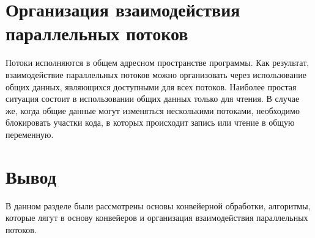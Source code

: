 \section{Организация взаимодействия параллельных потоков}
Потоки исполняются в общем адресном пространстве программы. Как результат, взаимодействие параллельных потоков можно организовать через использование общих данных, являющихся доступными для всех потоков. Наиболее простая ситуация состоит в использовании общих данных только для чтения. В случае же, когда общие данные могут изменяться несколькими потоками, необходимо блокировать участки кода, в которых происходит запись или чтение в общую переменную. 
\section*{Вывод}
В данном разделе были рассмотрены основы конвейерной обработки, алгоритмы, которые лягут в основу конвейеров и
организация взаимодействия параллельных потоков.